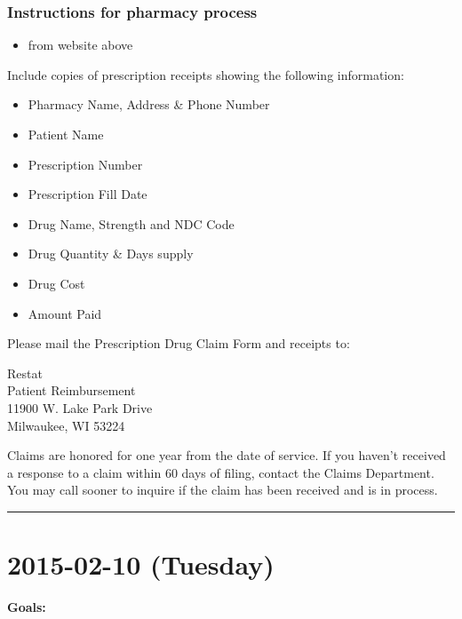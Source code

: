 \documentclass[letterpaper]{scrartcl}
\renewenvironment{quote}{\begin{blockquote}\list{}{\rightmargin=0em\leftmargin=0em}%
\item\relax\color{greytext}\ignorespaces}{\unskip\unskip\endlist\end{blockquote}}
\begin{document}
\subsubsection{Instructions for pharmacy
process}\label{instructions-for-pharmacy-process}

\begin{itemize}
\itemsep1pt\parskip0pt
\item
  from website above
\end{itemize}

\begin{quote}
Include copies of prescription receipts showing the following
information:

\begin{itemize}
\itemsep1pt\parskip0pt
\item
  Pharmacy Name, Address \& Phone Number
\item
  Patient Name
\item
  Prescription Number
\item
  Prescription Fill Date
\item
  Drug Name, Strength and NDC Code
\item
  Drug Quantity \& Days supply
\item
  Drug Cost
\item
  Amount Paid
\end{itemize}

Please mail the Prescription Drug Claim Form and receipts to:

Restat\\Patient Reimbursement\\11900 W. Lake Park Drive\\Milwaukee, WI
53224

Claims are honored for one year from the date of service. If you haven't
received a response to a claim within 60 days of filing, contact the
Claims Department. You may call sooner to inquire if the claim has been
received and is in process.
\end{quote}

\begin{center}\rule{0.5\linewidth}{\linethickness}\end{center}

\section{2015-02-10 (Tuesday)}\label{tuesday-1}

\textbf{Goals:}
\end{document}

